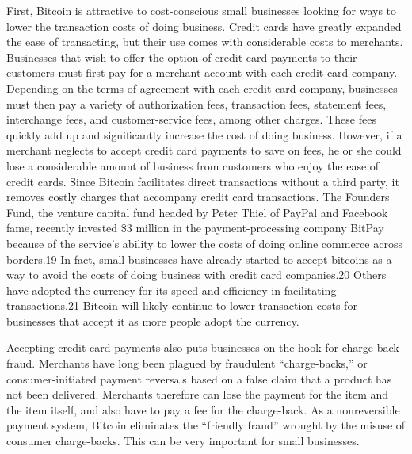 First, Bitcoin is attractive to cost-conscious small businesses
looking for ways to lower the transaction costs of doing business.
Credit cards have greatly expanded the ease of transacting, but
their use comes with considerable costs to merchants. Businesses
that wish to offer the option of credit card payments to their customers
must first pay for a merchant account with each credit
card company. Depending on the terms of agreement with each
credit card company, businesses must then pay a variety of
authorization fees, transaction fees, statement fees, interchange
fees, and customer-service fees, among other charges. These fees quickly add up and significantly increase the cost of doing business.
However, if a merchant neglects to accept credit card payments
to save on fees, he or she could lose a considerable amount
of business from customers who enjoy the ease of credit cards.
Since Bitcoin facilitates direct transactions without a third
party, it removes costly charges that accompany credit card transactions.
The Founders Fund, the venture capital fund headed by
Peter Thiel of PayPal and Facebook fame, recently invested \$3
million in the payment-processing company BitPay because of
the service’s ability to lower the costs of doing online commerce
across borders.19 In fact, small businesses have already started
to accept bitcoins as a way to avoid the costs of doing business
with credit card companies.20 Others have adopted the currency
for its speed and efficiency in facilitating transactions.21 Bitcoin
will likely continue to lower transaction costs for businesses that
accept it as more people adopt the currency.

Accepting credit card payments also puts businesses on the
hook for charge-back fraud. Merchants have long been plagued by
fraudulent “charge-backs,” or consumer-initiated payment reversals
based on a false claim that a product has not been delivered.
Merchants therefore can lose the payment for the item and the
item itself, and also have to pay a fee for the charge-back. As a
nonreversible payment system, Bitcoin eliminates the “friendly
fraud” wrought by the misuse of consumer charge-backs. This can
be very important for small businesses.

